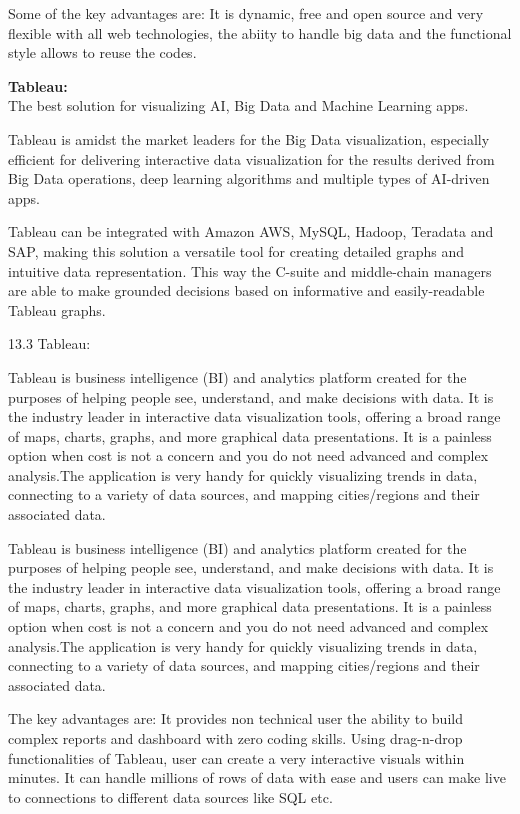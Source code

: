 \documentclass[]{book}
\theoremstyle{definition}
\theoremstyle{definition}
\theoremstyle{definition}
\theoremstyle{remark}
\begin{document}
Some of the key advantages are: It is dynamic, free and open source and
very flexible with all web technologies, the abiity to handle big data
and the functional style allows to reuse the codes.

\citep{d3_interactive_viz}

\textbf{Tableau:}\\
The best solution for visualizing AI, Big Data and Machine Learning
apps.

Tableau is amidst the market leaders for the Big Data visualization,
especially efficient for delivering interactive data visualization for
the results derived from Big Data operations, deep learning algorithms
and multiple types of AI-driven apps.

Tableau can be integrated with Amazon AWS, MySQL, Hadoop, Teradata and
SAP, making this solution a versatile tool for creating detailed graphs
and intuitive data representation. This way the C-suite and middle-chain
managers are able to make grounded decisions based on informative and
easily-readable Tableau graphs.

13.3 Tableau:

Tableau is business intelligence (BI) and analytics platform created for
the purposes of helping people see, understand, and make decisions with
data. It is the industry leader in interactive data visualization tools,
offering a broad range of maps, charts, graphs, and more graphical data
presentations. It is a painless option when cost is not a concern and
you do not need advanced and complex analysis.The application is very
handy for quickly visualizing trends in data, connecting to a variety of
data sources, and mapping cities/regions and their associated data.

Tableau is business intelligence (BI) and analytics platform created for
the purposes of helping people see, understand, and make decisions with
data. It is the industry leader in interactive data visualization tools,
offering a broad range of maps, charts, graphs, and more graphical data
presentations. It is a painless option when cost is not a concern and
you do not need advanced and complex analysis.The application is very
handy for quickly visualizing trends in data, connecting to a variety of
data sources, and mapping cities/regions and their associated data.

The key advantages are: It provides non technical user the ability to
build complex reports and dashboard with zero coding skills. Using
drag-n-drop functionalities of Tableau, user can create a very
interactive visuals within minutes. It can handle millions of rows of
data with ease and users can make live to connections to different data
sources like SQL etc.
\end{document}
